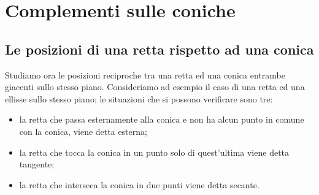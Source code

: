 
% 
% 


\chapter{Complementi sulle coniche}
\label{sec:coniche}

\section{Le posizioni di una retta rispetto ad una conica}
\label{sec:coniche_e_retta}

Studiamo ora le posizioni reciproche tra una retta ed una conica entrambe 
giacenti sullo stesso piano. Consideriamo ad esempio il caso di una retta 
ed una ellisse sullo stesso piano; le situazioni che si possono verificare 
sono tre:
\begin{itemize} [noitemsep]
  \item la retta che passa esternamente alla conica e non ha alcun 
punto in comune con la conica, viene detta esterna;
  \item la retta che tocca la conica in un punto solo di quest'ultima 
viene detta tangente;
  \item la retta che interseca la conica in due punti viene detta 
secante.
  \end{itemize}
  
